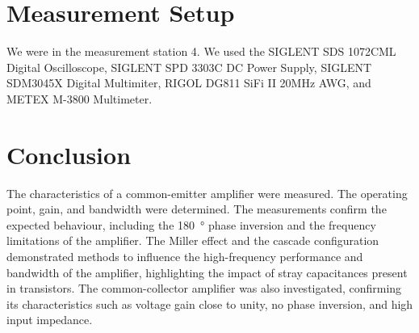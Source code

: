 \documentclass[12pt,a4paper]{article}
\begin{document}
\section{Measurement Setup}

We were in the measurement station 4. We used the SIGLENT SDS 1072CML Digital Oscilloscope, SIGLENT SPD 3303C DC Power Supply, SIGLENT SDM3045X Digital  Multimiter, RIGOL DG811 SiFi II 20MHz AWG, and METEX M-3800 Multimeter.

\section{Conclusion}
The characteristics of a common-emitter amplifier were measured. The operating point, gain, and bandwidth were determined. The measurements confirm the expected behaviour, including the \SI{180}{\degree} phase inversion and the frequency limitations of the amplifier. The Miller effect and the cascade configuration demonstrated methods to influence the high-frequency performance and bandwidth of the amplifier, highlighting the impact of stray capacitances present in transistors. The common-collector amplifier was also investigated, confirming its characteristics such as voltage gain close to unity, no phase inversion, and high input impedance.
\end{document}
